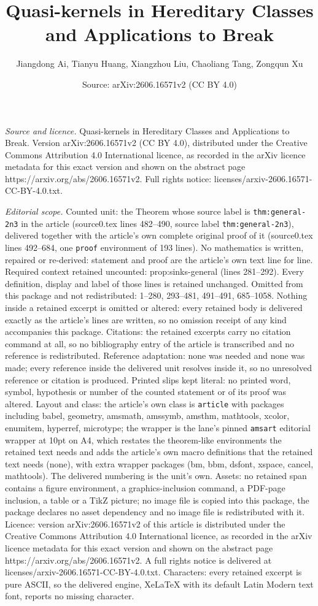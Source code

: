 \documentclass[10pt,a4paper]{amsart}
\title[Quasi-kernels in Hereditary Classes and Applications to Brea]{Quasi-kernels in Hereditary Classes and Applications to Break}
\author{Jiangdong Ai, Tianyu Huang, Xiangzhou Liu, Chaoliang Tang, Zongqun Xu}
\date{Source: arXiv:2606.16571v2 (CC BY 4.0)}
\begin{document}
\maketitle

\noindent\emph{Source and licence.} Quasi-kernels in Hereditary Classes and Applications to Break. Version arXiv:2606.16571v2 (CC BY 4.0), distributed under the Creative Commons Attribution 4.0 International licence, as recorded in the arXiv licence metadata for this exact version and shown on the abstract page https://arxiv.org/abs/2606.16571v2. Full rights notice: licenses/arxiv-2606.16571-CC-BY-4.0.txt.\par\smallskip

\noindent\textit{Editorial scope.} Counted unit: the Theorem whose source label is \texttt{thm:general-2n3} in the article (source0.tex lines 482--490, source label \texttt{thm:general-2n3}), delivered together with the article's own complete original proof of it (source0.tex lines 492--684, one \texttt{proof} environment of 193 lines). No mathematics is written, repaired or re-derived: statement and proof are the article's own text line for line. Required context retained uncounted: prop:sinks-general (lines 281--292). Every definition, display and label of those lines is retained unchanged. Omitted from this package and not redistributed: 1--280, 293--481, 491--491, 685--1058. Nothing inside a retained excerpt is omitted or altered: every retained body is delivered exactly as the article's lines are written, so no omission receipt of any kind accompanies this package. Citations: the retained excerpts carry no citation command at all, so no bibliography entry of the article is transcribed and no reference is redistributed. Reference adaptation: none was needed and none was made; every reference inside the delivered unit resolves inside it, so no unresolved reference or citation is produced. Printed slips kept literal: no printed word, symbol, hypothesis or number of the counted statement or of its proof was altered. Layout and class: the article's own class is \texttt{article} with packages including babel, geometry, amsmath, amssymb, amsthm, mathtools, xcolor, enumitem, hyperref, microtype; the wrapper is the lane's pinned \texttt{amsart} editorial wrapper at 10pt on A4, which restates the theorem-like environments the retained text needs and adds the article's own macro definitions that the retained text needs (none), with extra wrapper packages (bm, bbm, dsfont, xspace, cancel, mathtools). The delivered numbering is the unit's own. Assets: no retained span contains a figure environment, a graphics-inclusion command, a PDF-page inclusion, a table or a TikZ picture; no image file is copied into this package, the package declares no asset dependency and no image file is redistributed with it. Licence: version arXiv:2606.16571v2 of this article is distributed under the Creative Commons Attribution 4.0 International licence, as recorded in the arXiv licence metadata for this exact version and shown on the abstract page https://arxiv.org/abs/2606.16571v2. A full rights notice is delivered at licenses/arxiv-2606.16571-CC-BY-4.0.txt. Characters: every retained excerpt is pure ASCII, so the delivered engine, XeLaTeX with its default Latin Modern text font, reports no missing character.
\end{document}
